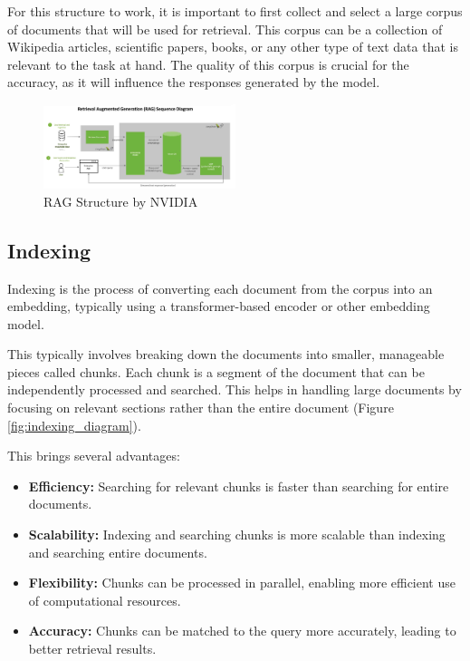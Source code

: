 \documentclass[conference]{IEEEtran}
\begin{document}
For this structure to work, it is important to first collect and select a large
corpus of documents that will be used for retrieval. This corpus can be a collection of
Wikipedia articles, scientific papers, books, or any other type of text data that is relevant to the task at hand.
The quality of this corpus is crucial for the accuracy, as it will influence the responses generated by the model.

\begin{figure}[htbp!]
    \centerline{\includegraphics[width=0.5\textwidth]{images/NVIDIA-RAG-diagram-scaled.jpg}}
    \caption{RAG Structure by NVIDIA \cite{merritt_what_2024}}
    \label{fig:rag_structure}
\end{figure}

\subsection{Indexing}
Indexing is the process of converting each document from the corpus into an embedding,
typically using a transformer-based encoder or other embedding model.

This typically involves breaking down the documents into smaller, manageable
pieces called chunks. Each chunk is a segment of the document that can be independently processed and searched.
This helps in handling large documents by focusing on relevant sections rather than the entire document (Figure \ref{fig:indexing_diagram}).

This brings several advantages:
\begin{itemize}
    \item \textbf{Efficiency:} Searching for relevant chunks is faster than searching for entire documents.
    \item \textbf{Scalability:} Indexing and searching chunks is more scalable than indexing and searching entire documents.
    \item \textbf{Flexibility:} Chunks can be processed in parallel, enabling more efficient use of computational resources.
    \item \textbf{Accuracy:} Chunks can be matched to the query more accurately, leading to better retrieval results.
\end{itemize}
\end{document}
